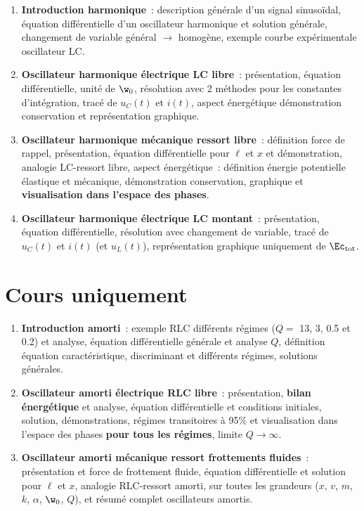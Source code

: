 \documentclass[a4paper, 12pt, final, garamond]{book}
\begin{document}
\begin{enumerate}[label=\Roman*]
    \item \textbf{Introduction harmonique}~: description générale d'un signal
        sinusoïdal, équation différentielle d'un oscillateur harmonique et
        solution générale, changement de variable général $\rightarrow$
        homogène, exemple courbe expérimentale oscillateur LC.
    \item \textbf{Oscillateur harmonique électrique LC libre}~: présentation,
        équation différentielle, unité de $\w_0$, résolution avec 2 méthodes
        pour les constantes d'intégration, tracé de $u_C(t)$ et $i(t)$, aspect
        énergétique démonstration conservation et représentation graphique.
    \item \textbf{Oscillateur harmonique mécanique ressort libre}~: définition
        force de rappel, présentation, équation différentielle pour $\ell$ et
        $x$ et démonstration, analogie LC-ressort libre, aspect énergétique~:
        définition énergie potentielle élastique et mécanique, démonstration
        conservation, graphique et \textbf{visualisation dans l'espace des
        phases}.
    \item \textbf{Oscillateur harmonique électrique LC montant}~: présentation,
        équation différentielle, résolution avec changement de variable, tracé
        de $u_C(t)$ et $i(t)$ (et $u_L(t)$), représentation graphique uniquement
        de $\Ec_{\rm tot}$.
\end{enumerate}

\section{Cours uniquement}
\bigbreak
\begin{enumerate}[label=\Roman*, start=5]
    \item \textbf{Introduction amorti}~: exemple RLC différents régimes ($Q =$
        13, 3, 0.5 et 0.2) et analyse, équation différentielle générale et
        analyse $Q$, définition équation caractéristique, discriminant et
        différents régimes, solutions générales.
    \item \textbf{Oscillateur amorti électrique RLC libre}~: présentation,
        \textbf{bilan énergétique} et analyse, équation différentielle et
        conditions initiales, solution, démonstrations, régimes transitoires à
        95\% et visualisation dans l'espace des phases \textbf{pour tous les
        régimes}, limite $Q \rightarrow \infty$.
    \item \textbf{Oscillateur amorti mécanique ressort frottements fluides}~:
        présentation et force de frottement fluide, équation différentielle et
        solution pour $\ell$ et $x$, analogie RLC-ressort amorti, sur toutes les
        grandeurs ($x$, $v$, $m$, $k$, $\alpha$, $\w_0$, $Q$), et résumé complet
        oscillateurs amortis.
\end{enumerate}
\end{document}
